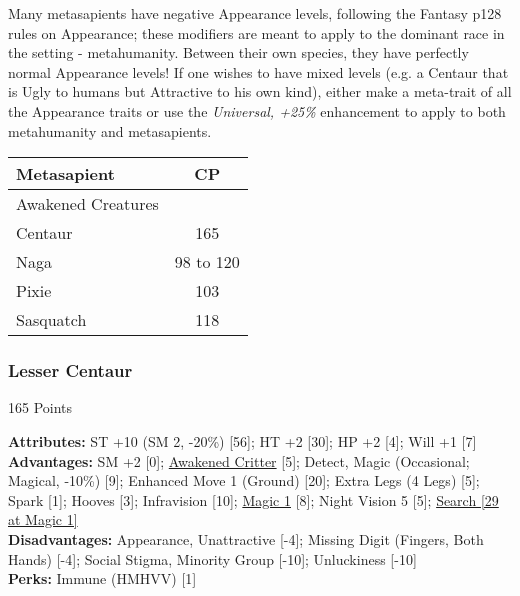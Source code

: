 \begin{multicols*}{3}
	Many metasapients have negative Appearance levels, following the Fantasy p128  rules on Appearance; these modifiers are meant to apply to the dominant race in the setting - metahumanity. Between their own species, they have perfectly normal Appearance levels! If one wishes to have mixed levels (e.g. a Centaur that is Ugly to humans but Attractive to his own kind), either make a meta-trait of all the Appearance traits or use the \textit{Universal, +25\%} enhancement to apply to both metahumanity and metasapients.
	
	\begin{center}
		\begin{tabularx}{0.32\textwidth}{|X|c|}
			\hline
			Metasapient & CP \\
			\hline
			\hline
			Awakened Creatures & \\
			\hline
			Centaur & 165 \\
			Naga & 98 to 120 \\
			Pixie & 103 \\
			Sasquatch & 118 \\
			\hline
		\end{tabularx}
	\end{center}
	
	\subsubsection*{Lesser Centaur}
	\begin{flushright}
		165 Points
	\end{flushright}
	\textbf{Attributes:}
	ST +10 (SM 2, -20\%) [56]; HT +2 [30]; HP +2 [4]; Will +1 [7]
	\\\textbf{Advantages:}
	SM +2 [0]; \hyperref[awakened_critter]{Awakened Critter} [5]; Detect, Magic (Occasional; Magical, -10\%) [9]; Enhanced Move 1 (Ground) [20]; Extra Legs (4 Legs) [5]; Spark [1]; Hooves [3]; Infravision [10]; \hyperref[magic]{Magic 1} [8]; Night Vision 5 [5]; \hyperref[search]{Search [29 at Magic 1]}
	\\\textbf{Disadvantages:} 
	Appearance, Unattractive [-4]; Missing Digit (Fingers, Both Hands) [-4]; Social Stigma, Minority Group [-10]; Unluckiness [-10]
	\\\textbf{Perks:}
	Immune (HMHVV) [1]
	

\end{multicols*}
